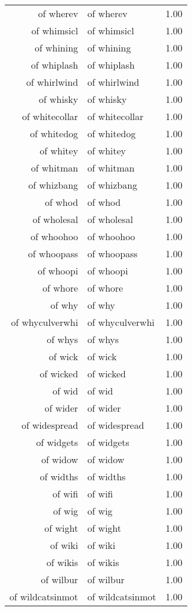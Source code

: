 \begin{table}[ht]
\begin{tabular}{rlr}
  of wherev & of wherev & 1.00 \\ 
  of whimsicl & of whimsicl & 1.00 \\ 
  of whining & of whining & 1.00 \\ 
  of whiplash & of whiplash & 1.00 \\ 
  of whirlwind & of whirlwind & 1.00 \\ 
  of whisky & of whisky & 1.00 \\ 
  of whitecollar & of whitecollar & 1.00 \\ 
  of whitedog & of whitedog & 1.00 \\ 
  of whitey & of whitey & 1.00 \\ 
  of whitman & of whitman & 1.00 \\ 
  of whizbang & of whizbang & 1.00 \\ 
  of whod & of whod & 1.00 \\ 
  of wholesal & of wholesal & 1.00 \\ 
  of whoohoo & of whoohoo & 1.00 \\ 
  of whoopass & of whoopass & 1.00 \\ 
  of whoopi & of whoopi & 1.00 \\ 
  of whore & of whore & 1.00 \\ 
  of why & of why & 1.00 \\ 
  of whyculverwhi & of whyculverwhi & 1.00 \\ 
  of whys & of whys & 1.00 \\ 
  of wick & of wick & 1.00 \\ 
  of wicked & of wicked & 1.00 \\ 
  of wid & of wid & 1.00 \\ 
  of wider & of wider & 1.00 \\ 
  of widespread & of widespread & 1.00 \\ 
  of widgets & of widgets & 1.00 \\ 
  of widow & of widow & 1.00 \\ 
  of widths & of widths & 1.00 \\ 
  of wifi & of wifi & 1.00 \\ 
  of wig & of wig & 1.00 \\ 
  of wight & of wight & 1.00 \\ 
  of wiki & of wiki & 1.00 \\ 
  of wikis & of wikis & 1.00 \\ 
  of wilbur & of wilbur & 1.00 \\ 
  of wildcatsinmot & of wildcatsinmot & 1.00 \\ 

\end{tabular}
\end{table}
